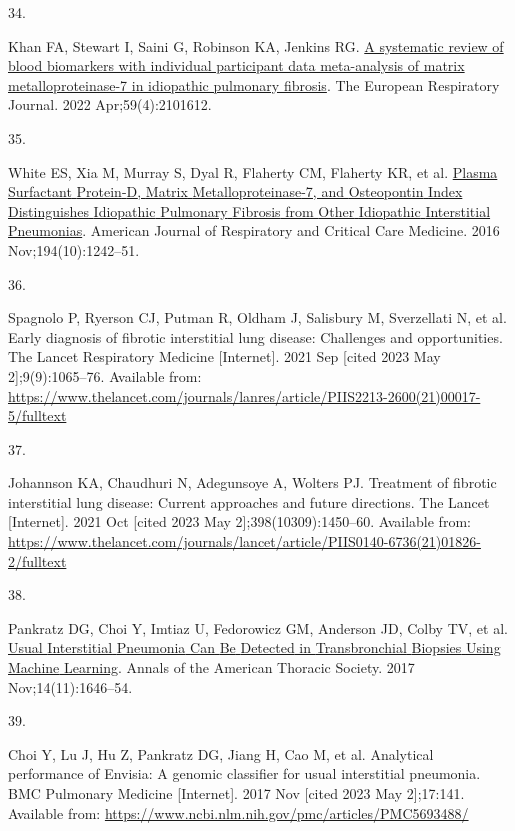 \documentclass[
]{article}
\newlength{\cslhangindent}
\newlength{\csllabelwidth}
\newenvironment{CSLReferences}[2] %
 {\begin{list}{}{%
  \setlength{\itemindent}{0pt}
  \setlength{\leftmargin}{0pt}
  \setlength{\parsep}{0pt}
  \ifodd #1
   \setlength{\leftmargin}{\cslhangindent}
   \setlength{\itemindent}{-1\cslhangindent}
  \fi
  \setlength{\itemsep}{#2\baselineskip}}}
 {\end{list}}
\newcommand{\CSLLeftMargin}[1]{\parbox[t]{\csllabelwidth}{\strut#1\strut}}
\newcommand{\CSLRightInline}[1]{\parbox[t]{\linewidth - \csllabelwidth}{\strut#1\strut}}
\begin{document}
\begin{CSLReferences}{0}{1}
\CSLLeftMargin{34. }%
\CSLRightInline{Khan FA, Stewart I, Saini G, Robinson KA, Jenkins RG. \href{https://doi.org/10.1183/13993003.01612-2021}{A systematic review of blood biomarkers with individual participant data meta-analysis of matrix metalloproteinase-7 in idiopathic pulmonary fibrosis}. The European Respiratory Journal. 2022 Apr;59(4):2101612. }

\CSLLeftMargin{35. }%
\CSLRightInline{White ES, Xia M, Murray S, Dyal R, Flaherty CM, Flaherty KR, et al. \href{https://doi.org/10.1164/rccm.201505-0862OC}{Plasma {Surfactant} {Protein}-{D}, {Matrix} {Metalloproteinase}-7, and {Osteopontin} {Index} {Distinguishes} {Idiopathic} {Pulmonary} {Fibrosis} from {Other} {Idiopathic} {Interstitial} {Pneumonias}}. American Journal of Respiratory and Critical Care Medicine. 2016 Nov;194(10):1242--51. }

\CSLLeftMargin{36. }%
\CSLRightInline{Spagnolo P, Ryerson CJ, Putman R, Oldham J, Salisbury M, Sverzellati N, et al. Early diagnosis of fibrotic interstitial lung disease: Challenges and opportunities. The Lancet Respiratory Medicine {[}Internet{]}. 2021 Sep {[}cited 2023 May 2{]};9(9):1065--76. Available from: \url{https://www.thelancet.com/journals/lanres/article/PIIS2213-2600(21)00017-5/fulltext}}

\CSLLeftMargin{37. }%
\CSLRightInline{Johannson KA, Chaudhuri N, Adegunsoye A, Wolters PJ. Treatment of fibrotic interstitial lung disease: Current approaches and future directions. The Lancet {[}Internet{]}. 2021 Oct {[}cited 2023 May 2{]};398(10309):1450--60. Available from: \url{https://www.thelancet.com/journals/lancet/article/PIIS0140-6736(21)01826-2/fulltext}}

\CSLLeftMargin{38. }%
\CSLRightInline{Pankratz DG, Choi Y, Imtiaz U, Fedorowicz GM, Anderson JD, Colby TV, et al. \href{https://doi.org/10.1513/AnnalsATS.201612-947OC}{Usual {Interstitial} {Pneumonia} {Can} {Be} {Detected} in {Transbronchial} {Biopsies} {Using} {Machine} {Learning}}. Annals of the American Thoracic Society. 2017 Nov;14(11):1646--54. }

\CSLLeftMargin{39. }%
\CSLRightInline{Choi Y, Lu J, Hu Z, Pankratz DG, Jiang H, Cao M, et al. Analytical performance of {Envisia}: A genomic classifier for usual interstitial pneumonia. BMC Pulmonary Medicine {[}Internet{]}. 2017 Nov {[}cited 2023 May 2{]};17:141. Available from: \url{https://www.ncbi.nlm.nih.gov/pmc/articles/PMC5693488/}}


\end{CSLReferences}
\end{document}
